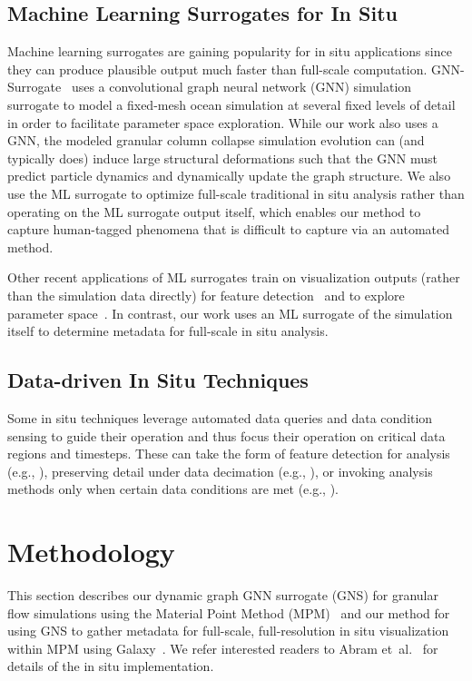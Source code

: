 \documentclass{vgtc}
\begin{document}
\subsection{Machine Learning Surrogates for In Situ}

Machine learning surrogates are gaining popularity for in situ applications since they can produce plausible output much faster than full-scale computation. GNN-Surrogate~\cite{shi22gnn} uses a convolutional graph neural network (GNN) simulation surrogate to model a fixed-mesh ocean simulation at several fixed levels of detail in order to facilitate parameter space exploration. While our work also uses a GNN, the modeled granular column collapse simulation evolution can (and typically does) induce large structural deformations such that the GNN must predict particle dynamics and dynamically update the graph structure. We also use the ML surrogate to optimize full-scale traditional in situ analysis rather than operating on the ML surrogate output itself, which enables our method to capture human-tagged phenomena that is difficult to capture via an automated method.

Other recent applications of ML surrogates train on visualization outputs (rather than the simulation data directly) for feature detection~\cite{dutta18insitu} and to explore parameter space~\cite{he20insitunet}. In contrast, our work uses an ML surrogate of the simulation itself to determine metadata for full-scale in situ analysis. 

\subsection{Data-driven In Situ Techniques}
Some in situ techniques leverage automated data queries and data condition sensing to guide their operation and thus focus their operation on critical data regions and timesteps. These can take the form of feature detection for analysis (e.g., \cite{dutta18insitu}), preserving detail under data decimation  (e.g., \cite{wang17sampling,biswas2018situ,biswas21sampling}), or invoking analysis methods only when certain data conditions are met (e.g., \cite{bennett2016trigger,larsen2018flexible,lawson21insitu}).


\section{Methodology}
\label{sec:method}

This section describes our dynamic graph GNN surrogate (GNS) for granular flow simulations using the Material Point Method (MPM)~\cite{kumar2019scalable,soga2016trends} and our method for using GNS to gather metadata for full-scale, full-resolution in situ visualization within MPM using Galaxy~\cite{abram18galaxy}. We refer interested readers to Abram et~al.~\cite{abram22insitu} for details of the in situ implementation.
\end{document}
